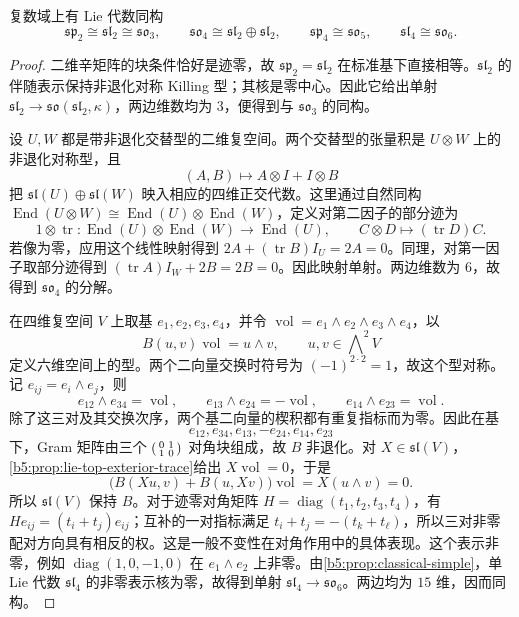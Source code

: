 \begin{proposition}[小维数同构]\label{b5:prop:classical-low-rank-isomorphisms}
	复数域上有 Lie 代数同构
	\[
		\mathfrak{sp}_2\cong\mathfrak{sl}_2\cong\mathfrak{so}_3,\qquad \mathfrak{so}_4\cong\mathfrak{sl}_2\oplus\mathfrak{sl}_2, \qquad \mathfrak{sp}_4\cong\mathfrak{so}_5,\qquad \mathfrak{sl}_4\cong\mathfrak{so}_6.
	\]
\end{proposition}
\begin{proof}
	二维辛矩阵的块条件恰好是迹零，故 \(\mathfrak{sp}_2=\mathfrak{sl}_2\) 在标准基下直接相等。\(\mathfrak{sl}_2\) 的伴随表示保持非退化对称 Killing 型；其核是零中心。因此它给出单射 \(\mathfrak{sl}_2\rightarrow\mathfrak{so}(\mathfrak{sl}_2,\kappa)\)，两边维数均为 \(3\)，便得到与 \(\mathfrak{so}_3\) 的同构。

	设 \(U,W\) 都是带非退化交替型的二维复空间。两个交替型的张量积是 \(U\otimes W\) 上的非退化对称型，且
	\[
		(A,B)\longmapsto A\otimes I+I\otimes B
	\]
	把 \(\mathfrak{sl}(U)\oplus\mathfrak{sl}(W)\) 映入相应的四维正交代数。这里通过自然同构 \(\operatorname{End}(U\otimes W)\cong\operatorname{End}(U)\otimes\operatorname{End}(W)\)，定义对第二因子的部分迹为
	\[
		1\otimes\operatorname{tr}:\operatorname{End}(U)\otimes\operatorname{End}(W) \longrightarrow\operatorname{End}(U),\qquad C\otimes D\longmapsto(\operatorname{tr}D)C.
	\]
	若像为零，应用这个线性映射得到 \(2A+(\operatorname{tr}B)I_U=2A=0\)。同理，对第一因子取部分迹得到 \((\operatorname{tr}A)I_W+2B=2B=0\)。因此映射单射。两边维数为 \(6\)，故得到 \(\mathfrak{so}_4\) 的分解。

	在四维复空间 \(V\) 上取基 \(e_1,e_2,e_3,e_4\)，并令 \(\operatorname{vol}=e_1\wedge e_2\wedge e_3\wedge e_4\)，以
	\[
		B(u,v)\operatorname{vol}=u\wedge v,\qquad u,v\in\bigwedge\nolimits^2V
	\]
	定义六维空间上的型。两个二向量交换时符号为 \((-1)^{2\cdot2}=1\)，故这个型对称。记 \(e_{ij}=e_i\wedge e_j\)，则
	\[
		e_{12}\wedge e_{34}=\operatorname{vol},\qquad e_{13}\wedge e_{24}=-\operatorname{vol},\qquad e_{14}\wedge e_{23}=\operatorname{vol}.
	\]
	除了这三对及其交换次序，两个基二向量的楔积都有重复指标而为零。因此在基
	\[
		e_{12},e_{34},e_{13},-e_{24},e_{14},e_{23}
	\]
	下，Gram 矩阵由三个 \(\begin{psmallmatrix}0&1\\1&0\end{psmallmatrix}\) 对角块组成，故 \(B\) 非退化。对 \(X\in\mathfrak{sl}(V)\)，\cref{b5:prop:lie-top-exterior-trace}给出 \(X\operatorname{vol}=0\)，于是
	\[
		\bigl(B(Xu,v)+B(u,Xv)\bigr)\operatorname{vol} =X(u\wedge v)=0.
	\]
	所以 \(\mathfrak{sl}(V)\) 保持 \(B\)。对于迹零对角矩阵 \(H=\operatorname{diag}(t_1,t_2,t_3,t_4)\)，有 \(He_{ij}=(t_i+t_j)e_{ij}\)；互补的一对指标满足 \(t_i+t_j=-(t_k+t_\ell)\)，所以三对非零配对方向具有相反的权。这是一般不变性在对角作用中的具体表现。这个表示非零，例如 \(\operatorname{diag}(1,0,-1,0)\) 在 \(e_1\wedge e_2\) 上非零。由\cref{b5:prop:classical-simple}，单 Lie 代数 \(\mathfrak{sl}_4\) 的非零表示核为零，故得到单射 \(\mathfrak{sl}_4\rightarrow\mathfrak{so}_6\)。两边均为 \(15\) 维，因而同构。


\end{proof}
